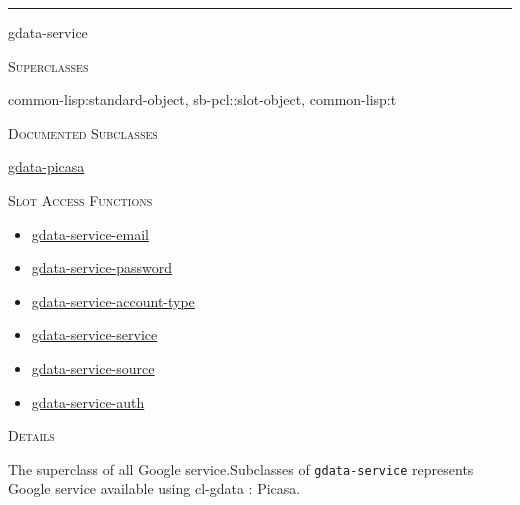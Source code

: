 \documentclass[a4paper]{report}
\begin{document}
  

    \rule{\linewidth}{0.1mm}
    
    \label{cl-gdata-service__class__gdata-service}
    \begin{defun}[Class]
    gdata-service


      
    \bigskip
    \textsc{Superclasses}

\color[rgb]{0.5,0.5,0.5}common-lisp:standard-object\color[rgb]{0,0,0}, \color[rgb]{0.5,0.5,0.5}sb-pcl::slot-object\color[rgb]{0,0,0}, \color[rgb]{0.5,0.5,0.5}common-lisp:t\color[rgb]{0,0,0}


      
    \bigskip
    \textsc{Documented Subclasses}

\hyperref[cl-gdata-picasa__class__gdata-picasa]{
	  gdata-picasa
	}
      


      
    \bigskip
    \textsc{Slot Access Functions}


	
    \begin{itemize}
    
	  
    \item
    \hyperref[cl-gdata-service__fun__gdata-service-email]{gdata-service-email}
    
    \item
    \hyperref[cl-gdata-service__fun__gdata-service-password]{gdata-service-password}
    
    \item
    \hyperref[cl-gdata-service__fun__gdata-service-account-type]{gdata-service-account-type}
    
    \item
    \hyperref[cl-gdata-service__fun__gdata-service-service]{gdata-service-service}
    
    \item
    \hyperref[cl-gdata-service__fun__gdata-service-source]{gdata-service-source}
    
    \item
    \hyperref[cl-gdata-service__fun__gdata-service-auth]{gdata-service-auth}
    
	
    \end{itemize}
  
      


	
    \bigskip
    \textsc{Details}

The superclass of all Google service.Subclasses of \texttt{gdata-service} represents Google service available using
cl-gdata : Picasa.


    
    \end{defun}
  
\end{document}
